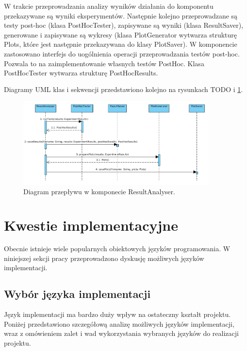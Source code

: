 \documentclass[12pt]{article}
\begin{document}
W trakcie przeprowadzania analizy wyników działania do komponentu przekazywane są wyniki eksperymentów. Następnie kolejno przeprowadzane są testy post-hoc (klasa PostHocTester), zapisywane są wyniki (klasa ResultSaver), generowane i zapisywane są wykresy (klasa PlotGenerator wytwarza strukturę Plots, które jest następnie przekazywana do klasy PlotSaver). W komponencie zastosowano interfejs do uogólnienia operacji przeprowadzania testów post-hoc. Pozwala to na zaimplementowanie własnych testów PostHoc. Klasa PostHocTester wytwarza strukturę PostHocResults.


Diagramy UML klas i sekwencji przedstawiono kolejno na rysunkach TODO i \ref{fig:sequenceResultAnalyser}.

\begin{figure}
	\centering
	\includegraphics[width=0.9\textwidth]{img/sequenceResultAnalyser.png}
	\caption{Diagram przepływu w komponecie ResultAnalyser.}
	\label{fig:sequenceResultAnalyser}
\end{figure}



\section{Kwestie implementacyjne}

Obecnie istnieje wiele popularnych obiektowych języków programowania. W niniejszej sekcji pracy przeprowadzono dyskusję możliwych języków implementacji.

\subsection{Wybór języka implementacji}

Język implementacji ma bardzo duży wpływ na ostateczny kształt projektu. Poniżej przedstawiono szczegółową analizę możliwych języków implementacji, wraz z omówieniem zalet i wad wykorzystania wybranych języków do realizacji projektu.
\end{document}
